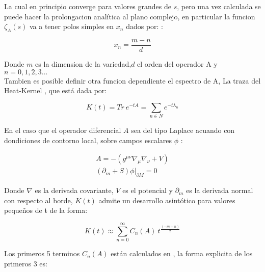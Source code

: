 La cual en principio converge para valores grandes de $s$, pero una vez calculada se puede hacer la prolongacion analítica al plano complejo, en particular la funcion $\zeta _A (s)$ va a tener polos simples en $x _n$ dados por:   :

\begin{equation}
x _n = \frac{m-n}{d} 
\label{eq.ceros.zeta}
\end{equation}

Donde $m$ es la dimension de la variedad,$d$ el orden del operador A y $n= 0,1,2,3 ...$ \\

Tambien es posible definir otra funcion dependiente el espectro de A, La traza del Heat-Kernel \cite{VASSILEVICH2003279}, que está dada por:

\begin{equation}
K (t) =  Tr \ e ^{-t A} = 
\sum _{n  \in N} e ^{-t \lambda _{n} }
\end{equation}

En el caso que el operador diferencial $A$ sea del tipo Laplace acuando con dondiciones de contorno local, sobre campos escalares $\phi $ :

\begin{equation}
\begin{array}{c}

A = - \left(
			g ^{\mu \nu} \nabla _{\mu} \nabla _{\nu} + V
			\right) \\
\left (\partial _m + S \right) \phi | _{\partial M} = 0

			

\end{array}
\end{equation}

Donde $\nabla$ es la derivada covariante, $V$ es el potencial y $\partial _m$ es la derivada normal con respecto al borde, $K(t)$ admite un desarrollo asintótico para valores pequeños de t  de la forma:

\begin{equation}
K(t) \approx 
\sum _{n=0} ^{\infty}
C _n (A) \ 
t ^{\frac{(-m+n)}{2}}
\label{eq.heat.expansion}
\end{equation}



Los primeros 5 terminos $C _n (A) $ están calculados en \cite{VASSILEVICH2003279}, la forma explicita de los primeros 3 es: 

